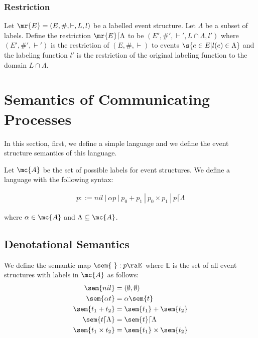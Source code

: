 \subsubsection{Restriction}

\begin{definition}[Restriction]
    Let $\mr{E} = (E,\#,\vdash,L,l)$ be a labelled event structure.
    Let $\Lambda$ be a subset of labels.
    Define the restriction $\mr{E}\lceil \Lambda$ to be $(E',\#',\vdash',L\cap \Lambda,l')$
    where $(E',\#',\vdash')$ is the restriction of $(E,\#,\vdash)$
    to events $\s{e \in E|l(e) \in \Lambda}$ and the labeling function $l'$
    is the restriction of the original labeling function to the domain $L \cap \Lambda$.
\end{definition}

\section{Semantics of Communicating Processes}
In this section, first, we define a simple language
and we define the event structure semantics of this language.


Let $\mc{A}$ be the set of possible labels for event structures.
We define a language with the following syntax:

\begin{align*}
    p ::= nil ~|~ \alpha p ~|~ p_0 + p_1 ~|~ p_0 \times p_1
    ~|~ p\lceil \Lambda
\end{align*}

where $\alpha \in \mc{A}$ and $\Lambda \subseteq \mc{A}$.

\subsection{Denotational Semantics}

\begin{definition}
    We define the semantic map $\sem{ \ }: p \ra \mathbb{E}$ where
    $\mathbb{E}$ is the set of all event structures with
    labels in $\mc{A}$ as follows:
    \begin{align*}
        \sem{nil}      & = (\emptyset,\emptyset)                  \\
        \sem{\alpha t} & = \alpha\sem{t}                        \\
        \sem{t_1 + t_2}
                        & = \sem{t_1} + \sem{t_2}                  \\
        \sem{t \lceil \Lambda}
                        & = \sem{t} \lceil \Lambda \\
        \sem{t_1 \times t_2}
                        & = \sem{t_1} \times \sem{t_2}
    \end{align*}
\end{definition}


